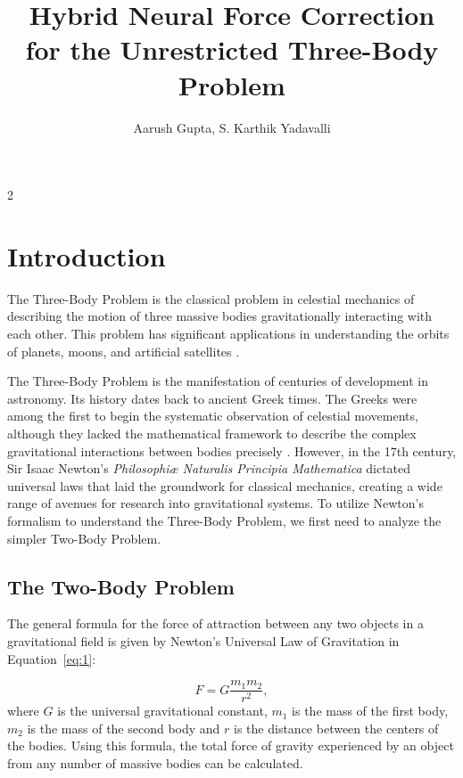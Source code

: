 \documentclass{article}
\title{Hybrid Neural Force Correction for the Unrestricted Three-Body Problem}
\author{Aarush Gupta, S. Karthik Yadavalli}
\begin{document}
\maketitle

\begin{multicols}{2} %

\section{Introduction}
\label{sec:introduction}
The Three-Body Problem is the classical problem in celestial mechanics of describing the motion of three massive bodies gravitationally interacting with each other. This problem has significant applications in understanding the orbits of planets, moons, and artificial satellites \citep{gardner2006james}.

The Three-Body Problem is the manifestation of centuries of development in astronomy. Its history dates back to ancient Greek times. The Greeks were among the first to begin the systematic observation of celestial movements, although they lacked the mathematical framework to describe the complex gravitational interactions between bodies precisely \citep{anjum2020timelinegravity}. However, in the 17th century, Sir Isaac Newton’s \textit{Philosophiæ Naturalis Principia Mathematica} \citep{newton1687principia, cohen1999principia} dictated universal laws that laid the groundwork for classical mechanics, creating a wide range of avenues for research into gravitational systems. To utilize Newton's formalism to understand the Three-Body Problem, we first need to analyze the simpler Two-Body Problem.

\subsection{The Two-Body Problem}
\label{subsec:2bp}
The general formula for the force of attraction between any two objects in a gravitational field is given by Newton’s Universal Law of Gravitation in Equation~\ref{eq:1}:

\begin{equation}
    F=G\frac{m_1m_2}{r^2},
    \label{eq:1}
\end{equation}
where $G$ is the universal gravitational constant, $m_1$ is the mass of the first body, $m_2$ is the mass of the second body and $r$ is the distance between the centers of the bodies. Using this formula, the total force of gravity experienced by an object from any number of massive bodies can be calculated.


\end{multicols}
\end{document}
